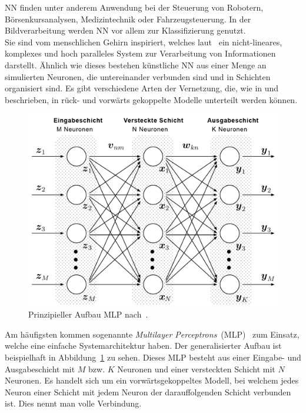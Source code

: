 \documentclass[times, 11pt,twocolumn]{article}
\begin{document}
 \label{sec:NeuronaleNetze}
NN finden unter anderem Anwendung bei der Steuerung von Robotern, Börsenkursanalysen, Medizintechnik oder Fahrzeugsteuerung. In der Bildverarbeitung werden NN vor allem zur Klassifizierung genutzt. \\
Sie sind vom menschlichen Gehirn inspiriert, welches laut~\cite{NNHaykin} ein nicht-lineares, komplexes und hoch paralleles System zur Verarbeitung von Informationen darstellt. Ähnlich wie dieses bestehen künstliche NN aus einer Menge an simulierten Neuronen, die untereinander verbunden sind und in Schichten organisiert sind. Es gibt verschiedene Arten der Vernetzung, die, wie in \cite{NNHaykin} und \cite{NNStanley} beschrieben, in rück- und vorwärts gekoppelte Modelle unterteilt werden können.\\
\begin{figure}
	\flushleft
	\includegraphics[width=\columnwidth]{Bilder/structure-mlp.jpg}
	\caption{Prinzipieller Aufbau MLP nach~\cite{MDPI}.}
	\label{fig:MLP}
\end{figure}
Am häufigsten kommen sogenannte \textit{Multilayer Perceptrons}~(MLP)~\cite{NNBraun}\cite{NNNauck}\cite{NNStanley} zum Einsatz, welche eine einfache Systemarchitektur haben. Der generalisierter Aufbau ist beispielhaft in Abbildung~\ref{fig:MLP} zu sehen. Dieses MLP besteht aus einer Eingabe- und Ausgabeschicht mit $M$ bzw. $K$ Neuronen und einer versteckten Schicht mit $N$ Neuronen. Es handelt sich um ein vorwärtsgekoppeltes Modell, bei welchem jedes Neuron einer Schicht mit jedem Neuron der darauffolgenden Schicht verbunden ist. Dies nennt man volle Verbindung. \\
\end{document}

